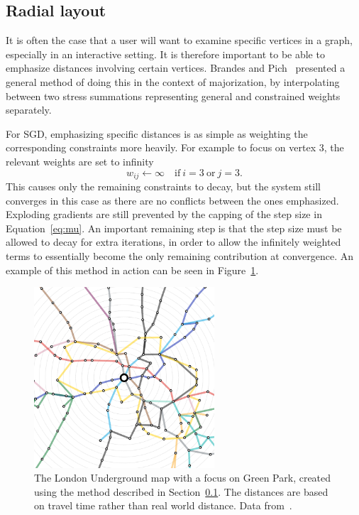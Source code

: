 \subsection{Radial layout}
\label{sec:sgd_radial}

It is often the case that a user will want to examine specific vertices in a graph, especially in an interactive setting. It is therefore important to be able to emphasize distances involving certain vertices.
Brandes and Pich~\cite{Brandes2011} presented a general method of doing this in the context of majorization, by interpolating between two stress summations representing general and constrained weights separately.

For SGD, emphasizing specific distances is as simple as weighting the corresponding constraints more heavily.
For example to focus on vertex 3, the relevant weights are set to infinity
\begin{equation}
  w_{ij} \leftarrow \infty \quad \text{if}\ i=3\ \text{or}\ j=3.
\end{equation}
This causes only the remaining constraints to decay, but the system still converges in this case as there are no conflicts between the ones emphasized. Exploding gradients are still prevented by the capping of the step size in Equation~\eqref{eq:mu}.
An important remaining step is that the step size must be allowed to decay for extra iterations, in order to allow the infinitely weighted terms to essentially become the only remaining contribution at convergence. 
An example of this method in action can be seen in Figure~\ref{fig:tube}.

\begin{figure}
  \centering
  \includegraphics[width=0.6\textwidth]{stress/tube.png}
  \caption[The London tube map with a focus on Green Park station]{The London Underground map with a focus on Green Park, created using the method described in Section~\ref{sec:sgd_radial}. The distances are based on travel time rather than real world distance.
  Data from~\cite{Trotman2016}.}
  \label{fig:tube}
\end{figure}


